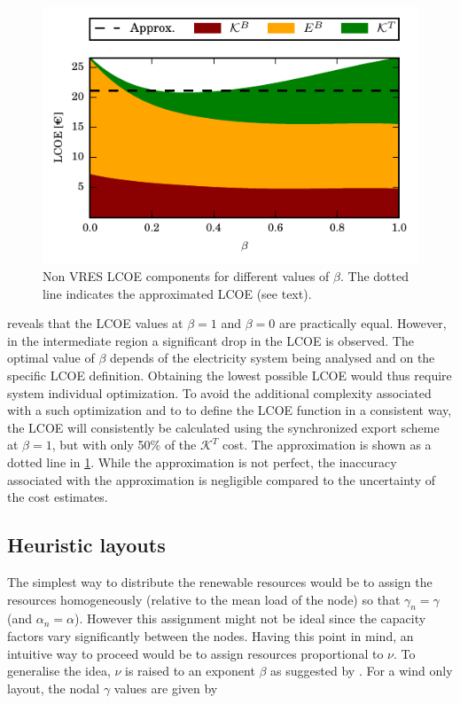 \documentclass[a4paper, 5p, sort&compress]{elsarticle}%
\begin{document}
\begin{figure}[h!]
  \centering
  \includegraphics[width = \columnwidth]{constrainedSync}
  \caption{Non VRES LCOE components for different values of $\beta$. The
    dotted line indicates the approximated LCOE (see text).}
  \label{fig:transmission-lcoe}
\end{figure}

 reveals that the LCOE values at
$\beta = 1$ and $\beta = 0$ are practically equal. However, in the
intermediate region a significant drop in the LCOE is observed. The
optimal value of $\beta$ depends of the electricity system being analysed
and on the specific LCOE definition. Obtaining the lowest possible
LCOE would thus require system individual
optimization. To avoid the additional complexity associated with a
such optimization and to to define the LCOE function in a consistent
way, the LCOE will consistently be calculated using the synchronized
export scheme at $\beta=1$, but with only 50\% of the
$\mathcal{K}^{T}$ cost. The approximation is shown as a dotted line in
\cref{fig:transmission-lcoe}. While the approximation is not perfect,
the inaccuracy associated with the approximation is negligible
compared to the uncertainty of the cost estimates.

\subsection{Heuristic layouts}
\label{sec:heuristic-layouts}

The simplest way to distribute the renewable resources would be to
assign the resources homogeneously (relative to the mean load of the
node) so that $\gamma_{n} = \gamma$ (and $\alpha_{n} = \alpha$). However this assignment
might not be ideal since the capacity factors vary significantly
between the nodes. Having this point in mind, an intuitive way to
proceed would be to assign resources proportional to $\nu$. To
generalise the idea, $\nu$ is raised to an exponent $\beta$ as suggested by
\cite{Rolando}. For a wind only layout, the nodal $\gamma$ values are given by
\end{document}
